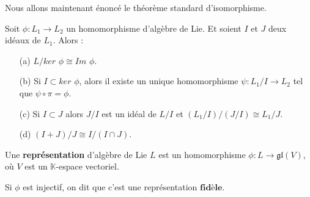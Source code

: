 \documentclass[a4paper,openany,12pt]{report}
\newcommand{\KK}{\mathbb{K}}
\newcommand{\gl}{\mathfrak{gl}}
\theoremstyle{break}
{\theorembodyfont{\upshape}
\newtheorem*{rmq}{Remarque :}
\newtheorem*{prv}{Preuve :}
\newtheorem*{ex}{Exemples :}
\newtheorem{exe}{Exemple : }
\newtheorem*{nota}{Notation :}}
\begin{document}
\quad Nous allons maintenant énoncé le théorème standard d'isomorphisme.

\begin{thm}\label{thm:iso}
Soit $\phi: L_{1}  \to L_{2} $ un homomorphisme d'algèbre de Lie. Et soient $I$ et $J$ deux idéaux de $L_{1}$.
Alors :
\begin{itemize}
\item[(a)] $L / ker$ $\phi \cong Im$ $\phi$.
\item[(b)] Si $I \subset ker$ $\phi$, alors il existe un unique homomorphisme $\psi: L_{1} / I \to L_{2} $ tel que $\psi \circ \pi= \phi$.
\item[(c)] Si $I \subset J$ alors $J / I$ est un idéal de $L/ I$ et $(L_{1} / I) /(J / I)\cong L_{1} / J$.
\item[(d)] $(I+J) / J \cong I /(I \cap J)$.
\end{itemize}
\end{thm}

\begin{df}
\quad  Une \textbf{représentation} d’algèbre de Lie $L$ est un homomorphisme $\phi: L \rightarrow \gl(V)$, où $V$ est un $\KK$-espace vectoriel.

Si $\phi$ est injectif, on dit que c'est une représentation  $\textbf{fidèle}$.
\end{df}
\end{document}
